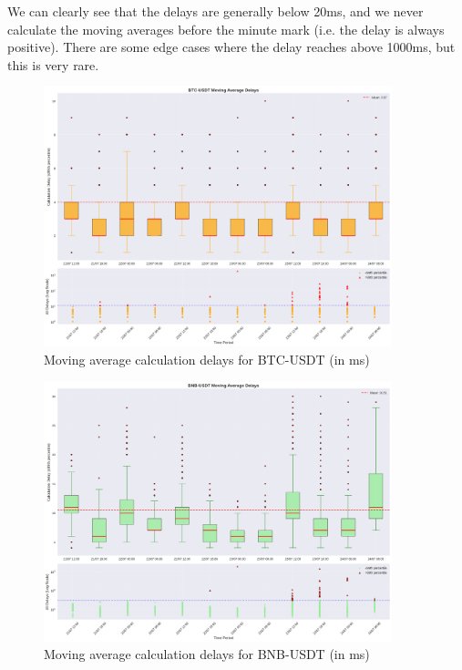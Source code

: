\documentclass{article}
\begin{document}
We can clearly see that the delays are generally below 20ms, and we never calculate the moving averages before
the minute mark (i.e. the delay is always positive). There are some edge cases where the delay reaches above 1000ms,
but this is very rare.

\begin{figure}[H]
    \centering
    \includegraphics[width=0.9\textwidth]{boxplot-MA-BTC.png}
    \caption{Moving average calculation delays for BTC-USDT (in ms)}
    \label{alg:delay-ma-btc}
\end{figure}

\begin{figure}[H]
    \centering
    \includegraphics[width=0.9\textwidth]{boxplot-MA-BNB.png}
    \caption{Moving average calculation delays for BNB-USDT (in ms)}
    \label{alg:delay-ma-bnb}
\end{figure}
\end{document}
